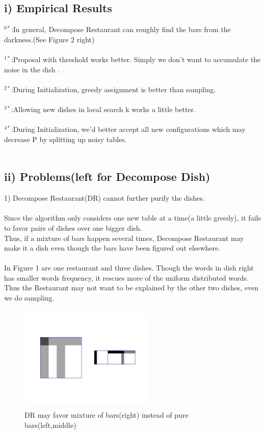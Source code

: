 \documentclass{article}
\begin{document}
\begin{spacing}{1.1}
\subsection{i)  Empirical Results}
$^{0*}$:In general, Decompose Restaurant can roughly find the bars from the darkness.(See Figure 2 right)\\ \\
$^{1*}$:Proposal with threshold works better. Simply we don't want to accumulate the noise in the dish .\\ \\
$^{2*}$:During Initialization, greedy assignment is better than sampling.\\ \\
$^{3*}$:Allowing new dishes in local search k works a little better.\\ \\
$^{4*}$:During Initialization, we'd better accept all new configurations which may decrease P by splitting up noisy tables.\\ \\
\subsection{ii) Problems{\small (left for Decompose Dish)}}
1) Decompose Restaurant(DR) cannot further purify the dishes.\\ \\
Since the algorithm only considers one new table at a time(a little greedy), it fails to favor pairs of dishes over one bigger dish.\\
Thus, if a mixture of bars happen several times, Decompose Restaurant may make it a dish even though the bars have been figured out elsewhere.\\ \\
In Figure 1 are one restaurant and three dishes. Though the words in dish right has smaller 
words frequency, it rescues more of the uniform distributed words. Thus the Restaurant may not want to be explained by the other two dishes, even we do sampling. 
\begin{figure}
 \centering
    \includegraphics[width=2.5in,height=2in]{eg.jpg} 
    \caption{DR may favor mixture of bars(right) instead of pure bars(left,middle)}
    \label{fig:by:table} 
\end{figure}


\end{spacing}
\end{document}
